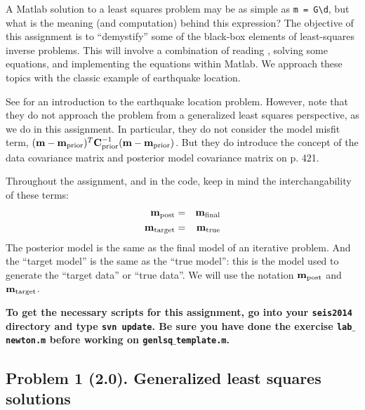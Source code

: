 \documentclass[11pt,titlepage,fleqn]{article}
\begin{document}
A Matlab solution to a least squares problem may be as simple as \verb+m = G\d+, but what is the meaning (and computation) behind this expression? The objective of this assignment is to ``demystify'' some of the black-box elements of least-squares inverse problems. This will involve a combination of reading \citet{Tarantola2005}, solving some equations, and implementing the equations within Matlab. We approach these topics with the classic example of earthquake location.

See \citet[][Chapter 7]{SteinWysession} for an introduction to the earthquake location problem. However, note that they do not approach the problem from a generalized least squares perspective, as we do in this assignment. In particular, they do not consider the model misfit term, $(\mbox{${\bf m}$}-\mbox{${\bf m}$}_{\rm prior})^T \mbox{${\bf C}$}_{\rm prior}^{-1} (\mbox{${\bf m}$}-\mbox{${\bf m}$}_{\rm prior})$. But they do introduce the concept of the data covariance matrix and posterior model covariance matrix on p. 421.

Throughout the assignment, and in the code, keep in mind the interchangability of these terms:
%
\begin{eqnarray*}
\mbox{${\bf m}$}_{\rm post} &=& \mbox{${\bf m}$}_{\rm final}
\\
\mbox{${\bf m}$}_{\rm target} &=& \mbox{${\bf m}$}_{\rm true}
\end{eqnarray*}
%
The posterior model is the same as the final model of an iterative problem. And the ``target model'' is the same as the ``true model'': this is the model used to generate the ``target data'' or ``true data''. We will use the notation $\mbox{${\bf m}$}_{\rm post}$ and $\mbox{${\bf m}$}_{\rm target}$.

\bigskip\noindent
{\bf To get the necessary scripts for this assignment, go into your {\tt seis2014} directory and type {\tt svn update}. Be sure you have done the exercise {\tt lab$\_$newton.m} before working on {\tt genlsq$\_$template.m}.}


\pagebreak
\subsection*{Problem 1 (2.0). Generalized least squares solutions}
\end{document}
